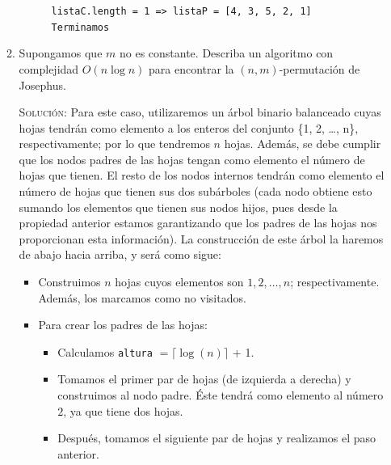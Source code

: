 \documentclass[letterpaper,11pt]{article}
\begin{document}
\begin{enumerate}
\begin{enumerate}
        \begin{figure}[h!]
        \centering
        \caption{\texttt{listaC.length = 1 => listaP = [4, 3, 5, 2, 1] Terminamos}}
        \end{figure}
          
        \item Supongamos que $m$ no es constante. Describa un algoritmo con
        complejidad $O(n \log n)$ para encontrar la $(n,m)$-permutación de 
        Josephus.

        \textsc{Solución:} Para este caso, utilizaremos un árbol binario 
        balanceado cuyas hojas tendrán como elemento a los enteros del conjunto 
        \{1, 2, \ldots, n\}, respectivamente; por lo que tendremos $n$ hojas. 
        Además, se debe cumplir que los nodos padres de las hojas tengan como 
        elemento el número de hojas que tienen. El resto de los nodos internos 
        tendrán como elemento el número de hojas que tienen sus dos subárboles
        (cada nodo obtiene esto sumando los elementos que tienen sus nodos 
        hijos, pues desde la propiedad anterior estamos garantizando que los 
        padres de las hojas nos proporcionan esta información).
        La construcción de este árbol la haremos de abajo hacia arriba, y será 
        como sigue:
        \begin{itemize}
            \item Construimos $n$ hojas cuyos elementos son $1, 2, \ldots, n$;
            respectivamente. Además, los marcamos como no visitados.

            \item Para crear los padres de las hojas:
            \begin{itemize}
                \item Calculamos \texttt{altura} $= \lceil \log(n)\rceil$ + 1. 
    
                \item Tomamos el primer par de hojas (de izquierda a derecha) y 
                construimos al nodo padre. Éste tendrá como elemento al número 
                $2$, ya que tiene dos hojas.
    
                \item Después, tomamos el siguiente par de hojas y realizamos el 
                paso anterior. 
                

\end{itemize}
\end{itemize}
\end{enumerate}
\end{enumerate}
\end{document}
